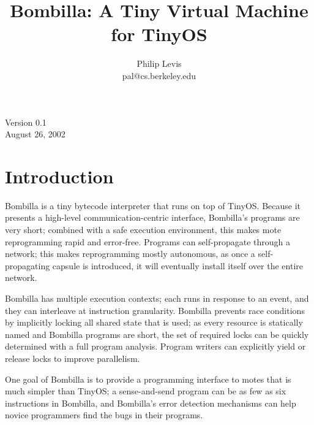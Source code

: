 \documentclass[10pt]{article}
\title{Bombilla: A Tiny Virtual Machine for TinyOS}
\author{Philip Levis\\pal@cs.berkeley.edu}
\date{}
\begin{document}

\maketitle
\vspace{2in}
\begin{center}
Version 0.1\\
August 26, 2002
\end{center}

\fontsize{10}{10}                               %


\thispagestyle{empty}
\newpage
\tableofcontents
\newpage

\section{Introduction}

Bombilla is a tiny bytecode interpreter that runs on top of
TinyOS. Because it presents a high-level communication-centric
interface, Bombilla's programs are very short; combined with a safe
execution environment, this makes mote reprogramming rapid and
error-free. Programs can self-propagate through a network; this makes
reprogramming mostly autonomous, as once a self-propagating capsule is
introduced, it will eventually install itself over the entire network.

Bombilla has multiple execution contexts; each runs in response to an
event, and they can interleave at instruction granularity. Bombilla
prevents race conditions by implicitly locking all shared state that
is used; as every resource is statically named and Bombilla programs
are short, the set of required locks can be quickly determined with a
full program analysis. Program writers can explicitly yield or release
locks to improve parallelism.

One goal of Bombilla is to provide a programming interface to motes
that is much simpler than TinyOS; a sense-and-send program can be as
few as six instructions in Bombilla, and Bombilla's error detection
mechanisms can help novice programmers find the bugs in their
programs.
\end{document}
